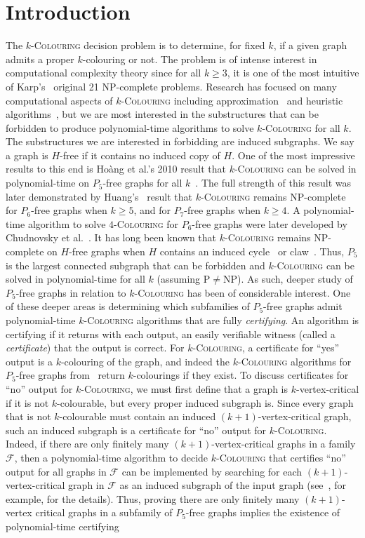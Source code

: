 \documentclass[11pt]{article}
\theoremstyle{definition}
\newcommand{\kcol}{$k$-\textsc{Colouring}}
\begin{document}
\section{Introduction}
The \kcol{} decision problem is to determine, for fixed $k$, if a given graph admits a proper $k$-colouring or not. The problem is of intense interest in computational complexity theory since for all $k\ge 3$, it is one of the most intuitive of Karp's~\cite{Karp1972} original 21 NP-complete problems. Research has focused on many computational aspects of \kcol{} including approximation~\cite{approximategraphcoloring} and heuristic algorithms~\cite{heuristicgraphcoloring}, but we are most interested in the substructures that can be forbidden to produce polynomial-time algorithms to solve \kcol{} for all $k$. The substructures we are interested in forbidding are induced subgraphs. We say a graph is $H$-free if it contains no induced copy of $H$. One of the most impressive results to this end is Ho\`{a}ng et al.'s 2010 result that \kcol{} can be solved in polynomial-time on $P_5$-free graphs for all $k$~\cite{Hoang2010}. The full strength of this result was later demonstrated by Huang's~\cite{Huang2016} result that \kcol{} remains NP-complete for $P_6$-free graphs when $k\ge 5$, and for $P_7$-free graphs when $k\ge 4$. A polynomial-time algorithm to solve $4$-\textsc{Colouring} for $P_6$-free graphs were later developed by Chudnovsky et al.~\cite{P6free1,P6free2,P6freeconf}. It has long been known that \kcol{} remains NP-complete on $H$-free graphs when $H$ contains an induced cycle~\cite{KaminskiLozin2007,MaffrayMorel2012} or claw~\cite{LevenGail1983,Holyer1981}. Thus, $P_5$ is the largest connected subgraph that can be forbidden and \kcol{} can be solved in polynomial-time for all $k$ (assuming P$\neq$NP). As such, deeper study of $P_5$-free graphs in relation to \kcol{} has been of considerable interest. One of these deeper areas is determining which subfamilies of $P_5$-free graphs admit polynomial-time \kcol{} algorithms that are fully \textit{certifying}. An algorithm is certifying if it returns with each output, an easily verifiable witness (called a \textit{certificate}) that the output is correct. For \kcol{}, a certificate for ``yes'' output is a $k$-colouring of the graph, and indeed the \kcol{} algorithms for $P_5$-free graphs from~\cite{Hoang2010} return $k$-colourings if they exist. To discuss certificates for ``no'' output for \kcol{}, we must first define that a graph is $k$-vertex-critical if it is not $k$-colourable, but every proper induced subgraph is. Since every graph that is not $k$-colourable must contain an induced $(k+1)$-vertex-critical graph, such an induced subgraph is a certificate for ``no'' output for \kcol{}. Indeed, if there are only finitely many $(k+1)$-vertex-critical graphs in a family $\mathcal{F}$, then a polynomial-time algorithm to decide \kcol{} that certifies ``no'' output for all graphs in $\mathcal{F}$ can be implemented by searching for each $(k+1)$-vertex-critical graph in $\mathcal{F}$ as an induced subgraph of the input graph (see~\cite{P5banner2019}, for example, for the details). Thus, proving there are only finitely many $(k+1)$-vertex critical graphs in a subfamily of $P_5$-free graphs implies the existence of polynomial-time certifying 
\end{document}

